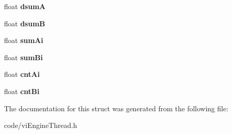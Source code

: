 \begin{DoxyCompactItemize}
\item 
\hypertarget{struct_c_v_i_engine_thread_1_1tag_t_m_p___s_t_a_t_a23e5c889258c787d09e9176b8f6d670c}{float {\bfseries dsum\+A}}\label{struct_c_v_i_engine_thread_1_1tag_t_m_p___s_t_a_t_a23e5c889258c787d09e9176b8f6d670c}

\item 
\hypertarget{struct_c_v_i_engine_thread_1_1tag_t_m_p___s_t_a_t_ae754be6a110348618402ce40f495a3a2}{float {\bfseries dsum\+B}}\label{struct_c_v_i_engine_thread_1_1tag_t_m_p___s_t_a_t_ae754be6a110348618402ce40f495a3a2}

\item 
\hypertarget{struct_c_v_i_engine_thread_1_1tag_t_m_p___s_t_a_t_a81b73bf1a21f7b5ca9235ec5e2cd1f90}{float {\bfseries sum\+Ai}}\label{struct_c_v_i_engine_thread_1_1tag_t_m_p___s_t_a_t_a81b73bf1a21f7b5ca9235ec5e2cd1f90}

\item 
\hypertarget{struct_c_v_i_engine_thread_1_1tag_t_m_p___s_t_a_t_a24a306060f8d7911ee7192cac265523f}{float {\bfseries sum\+Bi}}\label{struct_c_v_i_engine_thread_1_1tag_t_m_p___s_t_a_t_a24a306060f8d7911ee7192cac265523f}

\item 
\hypertarget{struct_c_v_i_engine_thread_1_1tag_t_m_p___s_t_a_t_ad5c691a4f5a4dca0c461909bd5dd27a7}{float {\bfseries cnt\+Ai}}\label{struct_c_v_i_engine_thread_1_1tag_t_m_p___s_t_a_t_ad5c691a4f5a4dca0c461909bd5dd27a7}

\item 
\hypertarget{struct_c_v_i_engine_thread_1_1tag_t_m_p___s_t_a_t_a4e1fc8a04fbf22508774ecdf52ff8d28}{float {\bfseries cnt\+Bi}}\label{struct_c_v_i_engine_thread_1_1tag_t_m_p___s_t_a_t_a4e1fc8a04fbf22508774ecdf52ff8d28}

\end{DoxyCompactItemize}


The documentation for this struct was generated from the following file\+:\begin{DoxyCompactItemize}
\item 
code/vi\+Engine\+Thread.\+h\end{DoxyCompactItemize}
